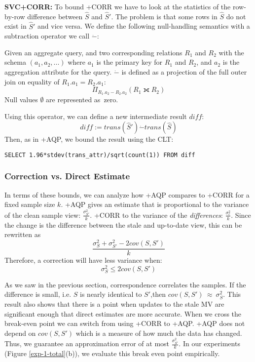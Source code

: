 \vspace{0.25em}

\noindent\textbf{SVC+CORR: } To bound \svcnospace+CORR we have to look at the statistics of the row-by-row difference between $\widehat{S}$ and $\widehat{S}'$. The problem is that some rows in $\widehat{S}$ do not exist in $\widehat{S}'$ and vice versa. We define the following null-handling semantics with a subtraction operator we call $\dot{-}$:
\begin{definition} Given an aggregate query, and two corresponding relations $R_1$ and $R_2$ with the schema $(a_1, a_2, ...)$ where $a_1$ is the primary key for $R_1$ and $R_2$, and $a_2$ is the aggregation attribute for the query. 
$\dot{-}$ is defined as a projection of the full outer join on equality of $R_1.a_1 = R_2.a_1$: \[ \Pi_{R_1.a_2 - R_2.a_2} ( R_1 \fullouterjoin R_2 ) \]
Null values $\emptyset$ are represented as~zero.
\end{definition}
Using this operator, we can define a new intermediate result $diff$:
\[diff := trans(\widehat{S}') \dot{-} trans(\widehat{S}) \]
Then, as in \svcnospace+AQP, we bound the result using the CLT:
\begin{lstlisting}[mathescape,basicstyle={\scriptsize}]
SELECT 1.96*stdev(trans_attr)/sqrt(count(1)) FROM diff
\end{lstlisting}

\subsubsection{Correction vs. Direct Estimate}
In terms of these bounds, we can analyze how \svcnospace+AQP compares to \svcnospace+CORR for a fixed sample size $k$.
\sloppy
\svcnospace+AQP gives an estimate that is proportional to the variance of the clean sample view: 
$\frac{\sigma_{S'}^2}{k}$.
\svcnospace+CORR to the variance of the \emph{differences}: 
$\frac{\sigma_{c}^2}{k}$.
Since the change is the difference between the stale and up-to-date view, this can be rewritten as
\[\frac{\sigma_{S}^2 + \sigma_{S'}^2 - 2cov(S,S')}{k}\]
Therefore, a correction will have less variance when:
\[\sigma_{S}^2 \le 2cov(S,S')\]

As we saw in the previous section, correspondence correlates the samples.
If the difference is small, i.e. $S$ is nearly identical to $S'$,then $cov(S,S')~\approx~\sigma_{S}^2$. 
This result also shows that there is a point when updates to the stale MV are significant enough that direct estimates are more accurate.
When we cross the break-even point we can switch from using \svcnospace+CORR to \svcnospace+AQP.
\svcnospace+AQP does not depend on $cov(S,S')$ which is a measure of how much the data has changed.
Thus, we guarantee an approximation error of at most $\frac{\sigma_{S'}^2}{k}$.
In our experiments (Figure \ref{exp-1-total}(b)), we evaluate this break even point empirically. 

